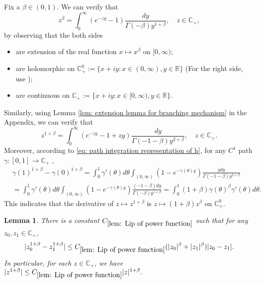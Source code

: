 \documentclass[12pt,oneside,english]{amsart}
\theoremstyle{plain}
\newtheorem{lem}[thm]{Lemma}
\theoremstyle{definition}
\numberwithin{equation}{section}
\begin{document}
{    Fix a $\beta \in (0,1)$.
    We can verify that
\begin{equation}
    z^{\beta}
	= \int_0^\infty (e^{-zy}-1) \frac{dy}{\Gamma(-\beta)y^{1+\beta}},
    \quad z\in \mathbb C_+,
\end{equation}
	by observing that the both sides
\begin{itemize}
\item
    are extension of the real function $x\mapsto x^{\beta}$ on $[0,\infty)$;
\item
    are holomorphic on $\mathbb C_+^0:= \{x+iy:x\in (0,\infty), y\in \mathbb R\}$ (For the right side, use \cite[Theorem 3.2. \& Theorem 3.5.]{SchillingSongVondracek2010Bernstein});
\item
    are continuous on $\mathbb C_+ :=\{x+iy: x\in [0,\infty), y\in \mathbb R\}$.
\end{itemize}
    Similarly, using Lemma \ref{lem: extension lemma for branching mechanism} in the Appendix, we can verify that
\begin{equation}
\label{eq: stable branching on C+}
    z^{1+\beta}
    = \int_0^\infty (e^{-zy}-1+zy)\frac{dy}{\Gamma(-1-\beta)y^{2+\beta}},
    \quad z\in \mathbb C_+.
\end{equation}
    Moreover, according to \eqref{eq: path integration representation of h}, for any $C^1$ path $\gamma:[0,1]\to \mathbb C_+$ ,
\begin{align}
\label{eq: integration formula for 1+beta-th power of z}
    &\gamma(1)^{1+\beta} - \gamma(0)^{1+\beta}
    = \int_0^1 \gamma'(\theta)d\theta \int_{(0,\infty)}(1-e^{-\gamma(\theta)y})\frac{ydy}{\Gamma(-1-\beta)y^{2+\beta}}
    \\&=\int_0^1 \gamma'(\theta)d\theta \int_{(0,\infty)}(1-e^{-\gamma(\theta)y})\frac{(-1-\beta)dy}{\Gamma(-\beta)y^{1+\beta}}
    = \int_0^1 (1+\beta) \gamma(\theta)^{\beta} \gamma'(\theta)d\theta.
\end{align}
    This indicates that the derivative of $z\mapsto z^{1+\beta}$ is $z\mapsto (1+\beta)z^{\beta}$ on $\mathbb C^0_+$.
\begin{lem}
\label{lem: Lip of power function}
    There is a constant $C_{\ref{lem: Lip of power function}}$ such that for any $z_0,z_1 \in \mathbb C_+$,
\begin{equation}
\label{eq: Lip of power function}
    |z_0^{1+\beta} - z_1^{1+\beta}|
    \leq C_{\ref{lem: Lip of power function}}(|z_0|^{\beta}+|z_1|^{\beta})|z_0 - z_1|.
\end{equation}
    In particular, for each $z\in \mathbb C_+$, we have
$
    |z^{1+\beta}|
    \leq  C_{\ref{lem: Lip of power function}} |z|^{1+\beta}.
$


\end{lem}}
\end{document}
